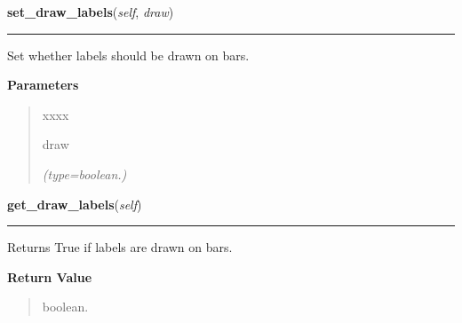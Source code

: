     \label{pygtk_chart:bar_chart:BarChart:set_draw_labels}

    \vspace{0.5ex}

\hspace{.8\funcindent}\begin{boxedminipage}{\funcwidth}

    \raggedright \textbf{set\_draw\_labels}(\textit{self}, \textit{draw})

    \vspace{-1.5ex}

    \rule{\textwidth}{0.5\fboxrule}
\setlength{\parskip}{2ex}
    Set whether labels should be drawn on bars.

\setlength{\parskip}{1ex}
      \textbf{Parameters}
      \vspace{-1ex}

      \begin{quote}
        \begin{Ventry}{xxxx}

          \item[draw]

            {\it (type=boolean.)}

        \end{Ventry}

      \end{quote}

    \end{boxedminipage}

    \label{pygtk_chart:bar_chart:BarChart:get_draw_labels}

    \vspace{0.5ex}

\hspace{.8\funcindent}\begin{boxedminipage}{\funcwidth}

    \raggedright \textbf{get\_draw\_labels}(\textit{self})

    \vspace{-1.5ex}

    \rule{\textwidth}{0.5\fboxrule}
\setlength{\parskip}{2ex}
    Returns True if labels are drawn on bars.

\setlength{\parskip}{1ex}
      \textbf{Return Value}
    \vspace{-1ex}

      \begin{quote}
      boolean.

      \end{quote}

    \end{boxedminipage}


